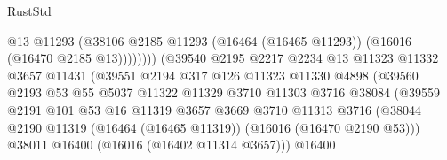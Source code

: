 \begin{lexlean}{RustStd}
\begin{coremodule}
                                            @13
                                            @11293
                                            (@38106
                                              @2185
                                              @11293
                                              (@16464 (@16465 @11293))
                                              (@16016 (@16470 @2185 @13))))))))
                                  (@39540
                                    @2195
                                    @2217
                                    @2234
                                    @13
                                    @11323
                                    @11332
                                    @3657
                                    @11431
                                    (@39551
                                      @2194
                                      @317
                                      @126
                                      @11323
                                      @11330
                                      @4898
                                      (@39560
                                        @2193
                                        @53
                                        @55
                                        @5037
                                        @11322
                                        @11329
                                        @3710
                                        @11303
                                        @3716
                                        @38084
                                        (@39559
                                          @2191
                                          @101
                                          @53
                                          @16
                                          @11319
                                          @3657
                                          @3669
                                          @3710
                                          @11313
                                          @3716
                                          (@38044
                                            @2190
                                            @11319
                                            (@16464 (@16465 @11319))
                                            (@16016 (@16470 @2190 @53)))
                                          @38011
                                          @16400
                                          (@16016 (@16402 @11314 @3657)))
                                        @16400

\end{coremodule}
\end{lexlean}
